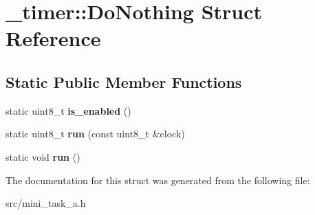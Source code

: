 \hypertarget{struct__timer_1_1DoNothing}{}\section{\+\_\+timer\+:\+:Do\+Nothing Struct Reference}
\label{struct__timer_1_1DoNothing}
\subsection*{Static Public Member Functions}
\begin{DoxyCompactItemize}
\item 
static uint8\+\_\+t {\bfseries is\+\_\+enabled} ()\hypertarget{struct__timer_1_1DoNothing_a1e99673fc42cee7d2862ea7dc8a49213}{}\label{struct__timer_1_1DoNothing_a1e99673fc42cee7d2862ea7dc8a49213}

\item 
static uint8\+\_\+t {\bfseries run} (const uint8\+\_\+t \&clock)\hypertarget{struct__timer_1_1DoNothing_a3ed1e85f61c729d9417abc83a581b260}{}\label{struct__timer_1_1DoNothing_a3ed1e85f61c729d9417abc83a581b260}

\item 
static void {\bfseries run} ()\hypertarget{struct__timer_1_1DoNothing_ab7a05783499667494ae2c311d882852e}{}\label{struct__timer_1_1DoNothing_ab7a05783499667494ae2c311d882852e}

\end{DoxyCompactItemize}


The documentation for this struct was generated from the following file\+:\begin{DoxyCompactItemize}
\item 
src/mini\+\_\+task\+\_\+a.\+h\end{DoxyCompactItemize}
